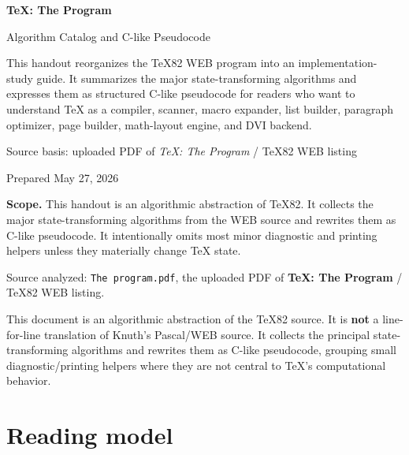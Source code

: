 \documentclass[11pt]{article}
\begin{document}
\hypersetup{pageanchor=false}%
\begin{titlepage}
  \centering
  \vspace*{2.5cm}
  {\Huge\bfseries\color{TeXBlue}\TeX: The Program\par}
  \vspace{0.5cm}
  {\LARGE Algorithm Catalog and C-like Pseudocode\par}
  \vspace{1.5cm}
  \begin{scopebox}
  This handout reorganizes the TeX82 WEB program into an implementation-study guide. It summarizes the major state-transforming algorithms and expresses them as structured C-like pseudocode for readers who want to understand TeX as a compiler, scanner, macro expander, list builder, paragraph optimizer, page builder, math-layout engine, and DVI backend.
  \end{scopebox}
  \vfill
  {\large Source basis: uploaded PDF of \textit{TeX: The Program} / TeX82 WEB listing\par}
  \vspace{0.25cm}
  {\large Prepared May 27, 2026\par}
\end{titlepage}\hypersetup{pageanchor=true}

\tableofcontents
\newpage

\begin{scopebox}
\textbf{Scope.} This handout is an algorithmic abstraction of TeX82. It collects the major state-transforming algorithms from the WEB source and rewrites them as C-like pseudocode. It intentionally omits most minor diagnostic and printing helpers unless they materially change TeX state.
\end{scopebox}

Source analyzed: \texttt{The program.pdf}, the uploaded PDF of \textbf{TeX: The Program} / TeX82 WEB listing.

This document is an algorithmic abstraction of the TeX82 source. It is
\textbf{not} a line-for-line translation of Knuth's Pascal/WEB source.
It collects the principal state-transforming algorithms and rewrites
them as C-like pseudocode, grouping small diagnostic/printing helpers
where they are not central to TeX's computational behavior.

\section{Reading model}\label{reading-model}
\end{document}
